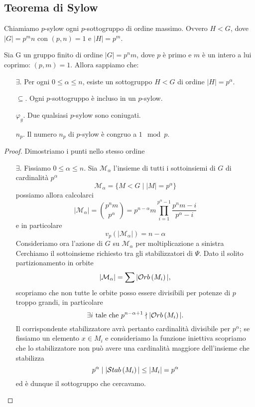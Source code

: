 \subsection{Teorema di Sylow}
\begin{multicols}{2}
	\begin{definition}
		Chiamiamo $ p $-sylow ogni $ p $-sottogruppo di ordine massimo. Ovvero $ H < G $, dove $ |G| = p^mn $ con $ (p, n) = 1 $ e $ |H| = p^m $.
	\end{definition}
\begin{theorem}[di Sylow]\label{sylow}
	Sia G un gruppo finito di ordine $ |G| = p^nm  $, dove $ p $ è primo e $ m $ è un intero a lui coprimo: $ (p, m) = 1 $. Allora sappiamo che:
	\begin{itemize}
		\item[$ \exists $.] Per ogni $ 0 \leq \alpha \leq n $, esiste un sottogruppo $ H<G $ di ordine $|H| = p^\alpha $.
		\item[$ \subseteq $.] Ogni $ p $-sottogruppo è incluso in un $ p $-sylow.
		\item[$ \varphi_g $.] Due qualsiasi $ p $-sylow sono coniugati.
		\item[$ n_p $.] Il numero $ n_p $ di $ p $-sylow è congruo a $ 1 \mod{p}$.
	\end{itemize}
\end{theorem}
\begin{proof}
		Dimostriamo i punti nello stesso ordine
	\begin{itemize}

		\item[$ \exists $.] Fissiamo $ 0 \leq \alpha \leq n $. Sia $ \mathcal{M}_\alpha $ l'insieme di tutti i sottoinsiemi di $ G $ di cardinalità $ p^\alpha $ \[ \mathcal{M}_\alpha = \{ M < G \mid |M| = p^\alpha \} \] possiamo allora calcolarci
		\[ |\mathcal{M}_\alpha| = {p^nm \choose p^\alpha} = p^{n-\alpha}m \prod_{i = 1}^{p^\alpha - 1}\frac{p^nm-i}{p^\alpha -i} \]
		e in particolare
		\[  v_p\left(\left|\mathcal{M}_\alpha\right|\right) = n - \alpha \]
		Consideriamo ora l'azione di $ G $ su $ \mathcal{M}_\alpha $ per moltiplicazione a sinistra
		Cerchiamo il sottoinsieme richiesto tra gli stabilizzatori di $ \Psi $. Dato il solito partizionamento in orbite
		\[ |\mathcal{M}_\alpha| = \sum |\mathcal{O}rb\left( M_i \right)|, \]
		scopriamo che non tutte le orbite posso essere divisibili per potenze di $ p $ troppo grandi, in particolare
		\[ \exists i \text{ tale che }  p^{n-\alpha +1}\nmid |\mathcal{O}rb\left( M_i \right)|. \]
		 Il corrispondente stabilizzatore avrà pertanto cardinalità divisibile per $ p^\alpha $;
		 se fissiamo un elemento $ x \in M_i $ e consideriamo la funzione iniettiva
		 scopriamo che lo stabilizzatore non può avere una cardinalità maggiore dell'insieme che stabilizza
		 \[ p^\alpha \mid |\mathcal{S}tab\left( M_i \right)| \leq |M_i| = p^\alpha \]
		 ed è dunque il sottogruppo che cercavamo.
		

\end{itemize}
\end{proof}
\end{multicols}
